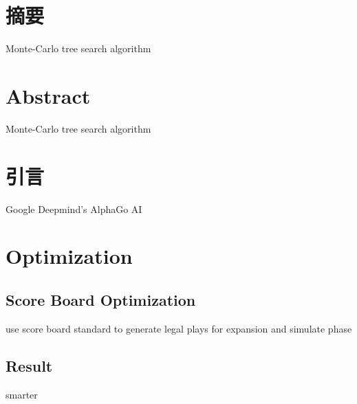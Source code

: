\null\thispagestyle{empty}
\newpage


\section*{摘要}
Monte-Carlo tree search algorithm\cite{wiki:Monte_Carlo_tree_search}\cite{DBLP:conf/ecml/KocsisS06}\cite{DBLP:conf/aiide/ChaslotBSS08}
\newpage

\section*{Abstract}
Monte-Carlo tree search algorithm\cite{wiki:Monte_Carlo_tree_search}\cite{DBLP:conf/ecml/KocsisS06}\cite{DBLP:conf/aiide/ChaslotBSS08}
\newpage


\tableofcontents
\newpage

\null\thispagestyle{empty}
\newpage


\section{引言}
Google Deepmind's AlphaGo AI\cite{DBLP:journals/nature/SilverHMGSDSAPL16}\cite{silver2017mastering}
\newpage

\section{Optimization}
\subsection{Score Board Optimization}
use score board standard to generate legal plays for expansion and simulate phase
\subsection{Result}
smarter
\newpage



\newpage


